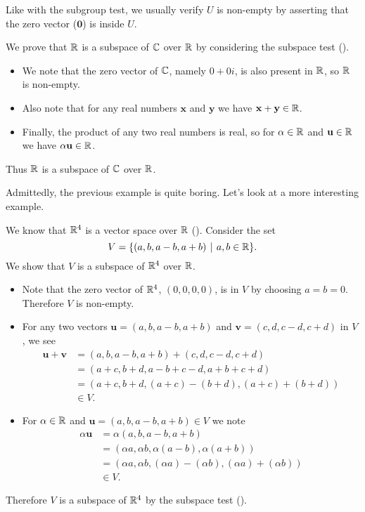 \begin{remark}
    Like with the subgroup test, we usually verify $U$ is non-empty by asserting that the zero vector ($\mathbf{0}$) is inside $U$.
\end{remark}

\begin{example}
    We prove that $\mathbb{R}$ is a subspace of $\mathbb{C}$ over $\mathbb{R}$ by considering the subspace test ().
    \begin{itemize}
        \item We note that the zero vector of $\mathbb{C}$, namely $0 + 0i$, is also present in $\mathbb{R}$, so $\mathbb{R}$ is non-empty.
        \item Also note that for any real numbers $\mathbf{x}$ and $\mathbf{y}$ we have $\mathbf{x} + \mathbf{y} \in \mathbb{R}$.
        \item Finally, the product of any two real numbers is real, so for $\alpha \in \mathbb{R}$ and $\mathbf{u} \in \mathbb{R}$ we have $\alpha\mathbf{u} \in \mathbb{R}$.
    \end{itemize}
    Thus $\mathbb{R}$ is a subspace of $\mathbb{C}$ over $\mathbb{R}$.
\end{example}

Admittedly, the previous example is quite boring. Let's look at a more interesting example.
\begin{example}
    We know that $\mathbb{R}^4$ is a vector space over $\mathbb{R}$ (). Consider the set
    \[
        V = \{(a, b, a-b, a+b) \vert a, b \in \R\}.
    \]
    We show that $V$ is a subspace of $\mathbb{R}^4$ over $\mathbb{R}$.
    \begin{itemize}
        \item Note that the zero vector of $\mathbb{R}^4$, $(0,0,0,0)$, is in $V$ by choosing $a = b = 0$. Therefore $V$ is non-empty.
        \item For any two vectors $\mathbf{u} = (a, b, a-b, a+b)$ and $\mathbf{v} = (c, d, c-d, c+d)$ in $V$, we see
        \begin{align*}
            \mathbf{u} + \mathbf{v} &= (a, b, a-b, a+b) + (c, d, c-d, c+d)\\
            &= (a + c, b + d, a - b + c - d, a + b + c + d)\\
            &= (a+c, b+d, (a+c)-(b+d), (a+c)+(b+d))\\
            &\in V.
        \end{align*}
        \item For $\alpha \in \mathbb{R}$ and $\mathbf{u} = (a, b, a-b, a+b) \in V$ we note
        \begin{align*}
            \alpha\mathbf{u} &= \alpha(a, b, a-b, a+b)\\
            &= (\alpha a, \alpha b, \alpha(a-b), \alpha(a+b))\\
            &= (\alpha a, \alpha b, (\alpha a) - (\alpha b), (\alpha a) + (\alpha b))\\
            &\in V.
        \end{align*}
    \end{itemize}
    Therefore $V$ is a subspace of $\mathbb{R}^4$ by the subspace test ().
\end{example}

